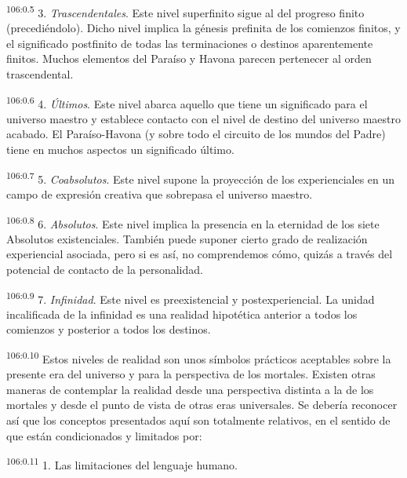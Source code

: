 \par
\textsuperscript{106:0.5} 3. \textit{Trascendentales}. Este nivel superfinito sigue al del progreso finito (precediéndolo). Dicho nivel implica la génesis prefinita de los comienzos finitos, y el significado postfinito de todas las terminaciones o destinos aparentemente finitos. Muchos elementos del Paraíso y Havona parecen pertenecer al orden trascendental.

\par
\textsuperscript{106:0.6} 4. \textit{Últimos}. Este nivel abarca aquello que tiene un significado para el universo maestro y establece contacto con el nivel de destino del universo maestro acabado. El Paraíso-Havona (y sobre todo el circuito de los mundos del Padre) tiene en muchos aspectos un significado último.

\par
\textsuperscript{106:0.7} 5. \textit{Coabsolutos}. Este nivel supone la proyección de los experienciales en un campo de expresión creativa que sobrepasa el universo maestro.

\par
\textsuperscript{106:0.8} 6. \textit{Absolutos}. Este nivel implica la presencia en la eternidad de los siete Absolutos existenciales. También puede suponer cierto grado de realización experiencial asociada, pero si es así, no comprendemos cómo, quizás a través del potencial de contacto de la personalidad.

\par
\textsuperscript{106:0.9} 7. \textit{Infinidad}. Este nivel es preexistencial y postexperiencial. La unidad incalificada de la infinidad es una realidad hipotética anterior a todos los comienzos y posterior a todos los destinos.

\par
\textsuperscript{106:0.10} Estos niveles de realidad son unos símbolos prácticos aceptables sobre la presente era del universo y para la perspectiva de los mortales. Existen otras maneras de contemplar la realidad desde una perspectiva distinta a la de los mortales y desde el punto de vista de otras eras universales. Se debería reconocer así que los conceptos presentados aquí son totalmente relativos, en el sentido de que están condicionados y limitados por:

\par
\textsuperscript{106:0.11} 1. Las limitaciones del lenguaje humano.

